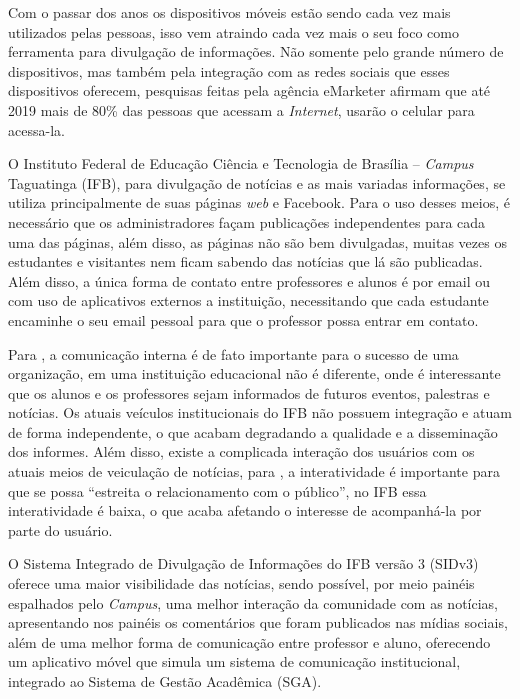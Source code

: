 Com o passar dos anos os dispositivos móveis estão sendo cada vez mais utilizados pelas pessoas, isso vem atraindo cada vez mais o seu foco como ferramenta para divulgação de informações. Não somente pelo grande número de dispositivos, mas também pela integração com as redes sociais que esses dispositivos oferecem, pesquisas feitas pela agência eMarketer afirmam que até 2019 mais de 80\% das pessoas que acessam a \textit{Internet}, usarão o celular para acessa-la.

O Instituto Federal de Educação Ciência e Tecnologia de Brasília -- \textit{Campus} Taguatinga (IFB), para divulgação de notícias e as mais variadas informações, se utiliza principalmente de suas páginas \textit{web} e Facebook. Para o uso desses meios, é necessário que os administradores façam publicações independentes para cada uma das páginas, além disso, as páginas não são bem divulgadas, muitas vezes os estudantes e visitantes nem ficam sabendo das notícias que lá são publicadas. Além disso, a única forma de contato entre professores e alunos é por email ou com uso de aplicativos externos a instituição, necessitando que cada estudante encaminhe o seu email pessoal para que o professor possa entrar em contato.

Para \citet{pinheiro2010}, a comunicação interna é de fato importante para o sucesso de uma organização, em uma instituição educacional não é diferente, onde é interessante que os alunos e os professores sejam informados de futuros eventos, palestras e notícias. Os atuais veículos institucionais do IFB não possuem integração e atuam de forma independente, o que acabam degradando a qualidade e a disseminação dos informes. Além disso, existe a complicada interação dos usuários com os atuais meios de veiculação de notícias, para \citet{santos2014}, a interatividade é importante para que se possa ``estreita o relacionamento com o público'', no IFB essa interatividade é baixa, o que acaba afetando o interesse de acompanhá-la por parte do usuário.

O Sistema Integrado de Divulgação de Informações do IFB versão 3 (SIDv3) oferece uma maior visibilidade das notícias, sendo possível, por meio painéis espalhados pelo \textit{Campus}, uma melhor interação da comunidade com as notícias, apresentando nos painéis os comentários que foram publicados nas mídias sociais, além de uma melhor forma de comunicação entre professor e aluno, oferecendo um aplicativo móvel que simula um sistema de comunicação institucional, integrado ao Sistema de Gestão Acadêmica (SGA).

